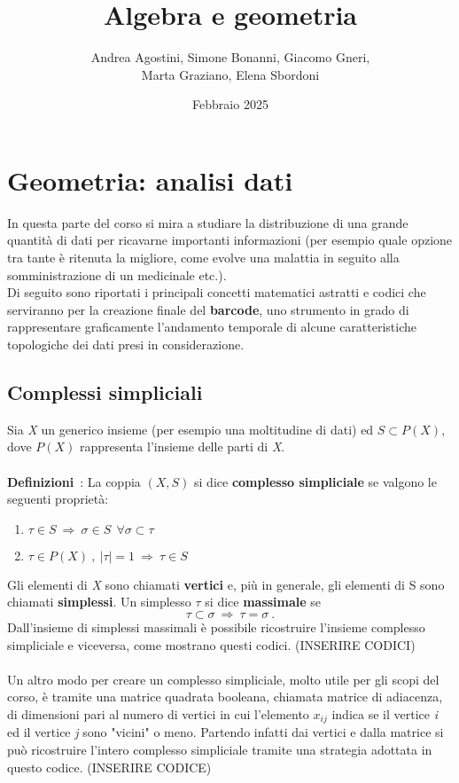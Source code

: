 \documentclass{article}
\title{Algebra e geometria}
\author{Andrea Agostini, Simone Bonanni, Giacomo Gneri,\\ Marta Graziano, Elena Sbordoni}
\date{Febbraio 2025}
\begin{document}
\maketitle
\tableofcontents
\section{Geometria: analisi dati}
In questa parte del corso si mira a studiare la distribuzione di una grande quantità di dati per ricavarne importanti informazioni (per esempio quale opzione tra tante è ritenuta la migliore, come evolve una malattia in seguito alla somministrazione di un medicinale etc.).\\ Di seguito sono riportati i principali concetti matematici astratti e codici che serviranno per la creazione finale del \textbf{barcode}, uno strumento in grado di rappresentare graficamente l'andamento temporale di alcune caratteristiche topologiche dei dati presi in considerazione.

\subsection{Complessi simpliciali}
Sia \textit{X} un generico insieme (per esempio una moltitudine di dati) ed \(S\subset P(X)\), dove \(P(X)\) rappresenta l'insieme delle parti di \textit{X}.\\ \\ \textbf{Definizioni}\ : La coppia \((X,S)\) si dice \textbf{complesso simpliciale} se valgono le seguenti proprietà:
\begin{enumerate}
\item \(\tau \in S\ \Rightarrow\  \sigma\in S\ \  \forall\sigma\subset\tau\)  
\item \(\tau\in P(X)\ ,\ |\tau|=1\ \Rightarrow \ \tau\in S\)
\end{enumerate}
Gli elementi di \textit{X} sono chiamati \textbf{vertici} e, più in generale, gli elementi di S sono chiamati \textbf{simplessi}. Un simplesso \(\tau\) si dice \textbf{massimale} se \[\tau\subset\sigma \ \Rightarrow\ \tau =\sigma\ .\]
Dall'insieme di simplessi massimali è possibile ricostruire l'insieme complesso simpliciale e viceversa, come mostrano questi codici. (INSERIRE CODICI)
\\ \\ Un altro modo per creare un complesso simpliciale, molto utile per gli scopi del corso, è tramite una matrice quadrata booleana, chiamata matrice di adiacenza, di dimensioni pari al numero di vertici in cui l'elemento \(x_{ij}\) indica se il vertice \textit{i} ed il vertice \textit{j} sono "vicini" o meno. Partendo infatti dai vertici e dalla matrice si può ricostruire l'intero complesso simpliciale tramite una strategia adottata in questo codice. (INSERIRE CODICE)
\end{document}
